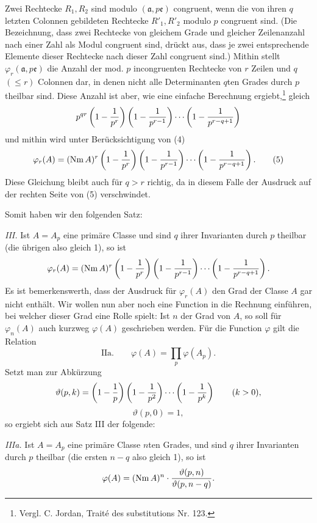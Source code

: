 \documentclass[11pt,a4paper]{article}
\newcommand{\Nm}{\operatorname{Nm}}
\newcommand{\tht}{\vartheta}
\begin{document}
Zwei Rechtecke $R_1,R_2$ sind modulo $(\mathfrak a,p\mathfrak e)$ congruent, wenn die von ihren $q$ letzten Colonnen gebildeten Rechtecke $R'_1,R'_2$ modulo $p$ congruent sind. (Die Bezeichnung, dass zwei Rechtecke von gleichem Grade und gleicher Zeilenanzahl nach einer Zahl als Modul congruent sind, drückt aus, dass je zwei entsprechende Elemente dieser Rechtecke nach dieser Zahl congruent sind.) Mithin stellt $\varphi_r(\mathfrak a,p\mathfrak e)$ die Anzahl der mod. $p$ incongruenten Rechtecke von $r$ Zeilen und $q$ $(\le r)$ Colonnen dar, in denen nicht alle Determinanten $q$ten Grades durch $p$ theilbar sind. Diese Anzahl ist aber, wie eine einfache Berechnung ergiebt,\footnote{Vergl. C. Jordan, Traité des substitutions Nr. 123.} gleich
\[
 p^{qr}\left(1-{1\over p^r}\right)
 \left(1-{1\over p^{r-1}}\right)
 \cdots
 \left(1-{1\over p^{r-q+1}}\right)
\]
und mithin wird unter Berücksichtigung von (4)
\begin{equation}
 \varphi_r(A)=(\Nm A)^r
 \left(1-{1\over p^r}\right)
 \left(1-{1\over p^{r-1}}\right)
 \cdots
 \left(1-{1\over p^{r-q+1}}\right).
\tag{5}
\end{equation}
Diese Gleichung bleibt auch für $q>r$ richtig, da in diesem Falle der Ausdruck auf der rechten Seite von (5) verschwindet.

Somit haben wir den folgenden Satz:

\emph{III.} Ist $A=A_p$ eine primäre Classe und sind $q$ ihrer Invarianten durch $p$ theilbar (die übrigen also gleich 1), so ist
\[
 \varphi_r(A)=(\Nm A)^r
 \left(1-{1\over p^r}\right)
 \left(1-{1\over p^{r-1}}\right)
 \cdots
 \left(1-{1\over p^{r-q+1}}\right).
\]
Es ist bemerkenswerth, dass der Ausdruck für $\varphi_r(A)$ den Grad der Classe $A$ gar nicht enthält. Wir wollen nun aber noch eine Function in die Rechnung einführen, bei welcher dieser Grad eine Rolle spielt: Ist $n$ der Grad von $A$, so soll für $\varphi_n(A)$ auch kurzweg $\varphi(A)$ geschrieben werden. Für die Function $\varphi$ gilt die Relation
\[
\text{IIa.}\qquad
 \varphi(A)=\prod_p \varphi(A_p).
\]
Setzt man zur Abkürzung
\[
 \tht(p,k)=\left(1-{1\over p}\right)
 \left(1-{1\over p^2}\right)\cdots
 \left(1-{1\over p^k}\right)\qquad (k>0),
\]
\[
 \tht(p,0)=1,
\]
so ergiebt sich aus Satz III der folgende:

\emph{IIIa.} Ist $A=A_p$ eine primäre Classe $n$ten Grades, und sind $q$ ihrer Invarianten durch $p$ theilbar (die ersten $n-q$ also gleich 1), so ist
\[
 \varphi(A)=(\Nm A)^n\cdot {\tht(p,n)\over \tht(p,n-q)}.
\]
\end{document}

